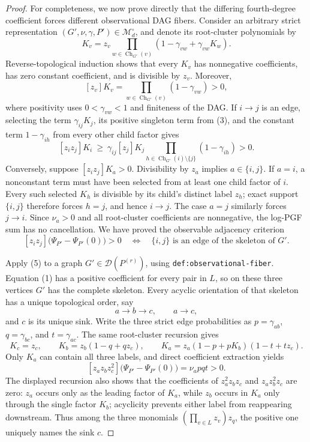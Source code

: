 \documentclass{article}
\begin{document}
\begin{proof}
For completeness, we now prove directly that the differing fourth-degree coefficient forces different observational DAG fibers.  Consider an arbitrary strict representation \((G',\nu,\gamma,P')\in\mathcal M_d^\circ\), and denote its root-cluster polynomials by
\[
K_v=z_v\prod_{w\in\operatorname{Ch}_{G'}(v)}
       (1-\gamma_{vw}+\gamma_{vw}K_w).
\]
Reverse-topological induction shows that every \(K_v\) has nonnegative coefficients, has zero constant coefficient, and is divisible by \(z_v\).  Moreover,
\[
[z_v]K_v=\prod_{w\in\operatorname{Ch}_{G'}(v)}(1-\gamma_{vw})>0,
\tag{3}
\]
where positivity uses \(0<\gamma_{vw}<1\) and finiteness of the DAG.  If \(i\to j\) is an edge, selecting the term \(\gamma_{ij}K_j\), its positive singleton term from (3), and the constant term \(1-\gamma_{ih}\) from every other child factor gives
\[
[z_iz_j]K_i\ \geq\
\gamma_{ij}[z_j]K_j
\prod_{h\in\operatorname{Ch}_{G'}(i)\setminus\{j\}}(1-\gamma_{ih})>0.
\tag{4}
\]
Conversely, suppose \([z_iz_j]K_a>0\).  Divisibility by \(z_a\) implies \(a\in\{i,j\}\).  If \(a=i\), a nonconstant term must have been selected from at least one child factor of \(i\).  Every such selected \(K_h\) is divisible by its child's distinct label \(z_h\); exact support \(\{i,j\}\) therefore forces \(h=j\), and hence \(i\to j\).  The case \(a=j\) similarly forces \(j\to i\).  Since \(\nu_a>0\) and all root-cluster coefficients are nonnegative, the log-PGF sum has no cancellation.  We have proved the observable adjacency criterion
\[
[z_iz_j]\bigl(\Psi_{P'}-\Psi_{P'}(0)\bigr)>0
\quad\Longleftrightarrow\quad
\{i,j\}\text{ is an edge of the skeleton of }G'.
\tag{5}
\]

Apply (5) to a graph \(G'\in\mathcal D(P^{(r)})\), using \texttt{def:observational-fiber}.  Equation (1) has a positive coefficient for every pair in \(L\), so on these three vertices \(G'\) has the complete skeleton.  Every acyclic orientation of that skeleton has a unique topological order, say
\[
a\longrightarrow b\longrightarrow c,
\qquad a\longrightarrow c,
\]
and \(c\) is its unique sink.  Write the three strict edge probabilities as \(p=\gamma_{ab}\), \(q=\gamma_{bc}\), and \(t=\gamma_{ac}\).  The same root-cluster recursion gives
\[
K_c=z_c,
\qquad
K_b=z_b(1-q+qz_c),
\qquad
K_a=z_a(1-p+pK_b)(1-t+tz_c).
\]
Only \(K_a\) can contain all three labels, and direct coefficient extraction yields
\[
\left[z_az_bz_c^2\right]
\bigl(\Psi_{P'}-\Psi_{P'}(0)\bigr)=\nu_a pqt>0.
\tag{6}
\]
The displayed recursion also shows that the coefficients of \(z_a^2z_bz_c\) and \(z_az_b^2z_c\) are zero: \(z_a\) occurs only as the leading factor of \(K_a\), while \(z_b\) occurs in \(K_a\) only through the single factor \(K_b\); acyclicity prevents either label from reappearing downstream.  Thus among the three monomials \((\prod_{v\in L}z_v)z_q\), the positive one uniquely names the sink \(c\).


\end{proof}
\end{document}
